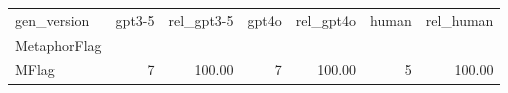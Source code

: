 \begin{tabular}{lrrrrrr}
\toprule
gen_version & gpt3-5 & rel_gpt3-5 & gpt4o & rel_gpt4o & human & rel_human \\
MetaphorFlag &  &  &  &  &  &  \\
\midrule
MFlag & 7 & 100.00 & 7 & 100.00 & 5 & 100.00 \\
\bottomrule
\end{tabular}
